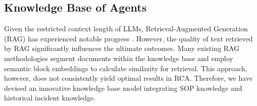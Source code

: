 \subsection{Knowledge Base of Agents}


Given the restricted context length of LLMs, Retrieval-Augmented Generation (RAG) has experienced notable progress \citep{jeong2024adaptive}. However, the quality of text retrieved by RAG significantly influences the ultimate outcomes. Many existing RAG methodologies segment documents within the knowledge base and employ semantic block embeddings to calculate similarity for retrieval. This approach, however, does not consistently yield optimal results in RCA. Therefore, we have devised an innovative knowledge base model integrating SOP knowledge and historical incident knowledge. 


    
